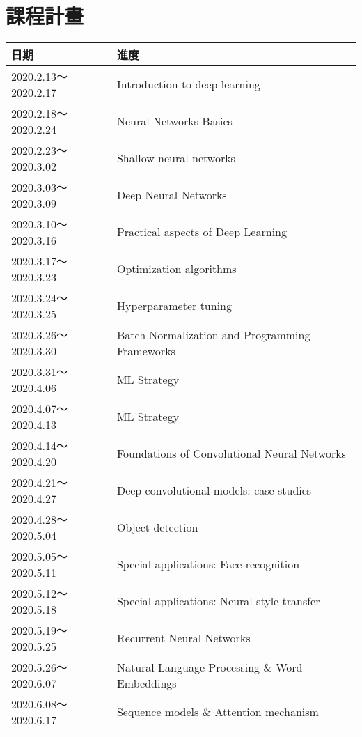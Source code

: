 \chapter*{課程計畫}
\begin{table}[H]
    \centering
    \begin{tabular}{|l|l|}
    \hline
        日期 & 進度 \\ \hline
        2020.2.13～2020.2.17 & Introduction to deep learning \\ \hline
        2020.2.18～2020.2.24 & Neural Networks Basics \\ \hline
        2020.2.23～2020.3.02 & Shallow neural networks \\ \hline
        2020.3.03～2020.3.09 & Deep Neural Networks \\ \hline
        2020.3.10～2020.3.16 & Practical aspects of Deep Learning \\ \hline
        2020.3.17～2020.3.23 & Optimization algorithms \\ \hline
        2020.3.24～2020.3.25 & Hyperparameter tuning \\ \hline
        2020.3.26～2020.3.30 & Batch Normalization and Programming Frameworks \\ \hline
        2020.3.31～2020.4.06 & ML Strategy \\ \hline
        2020.4.07～2020.4.13 & ML Strategy \\ \hline
        2020.4.14～2020.4.20 & Foundations of Convolutional Neural Networks \\ \hline
        2020.4.21～2020.4.27 & Deep convolutional models: case studies \\ \hline
        2020.4.28～2020.5.04 & Object detection \\ \hline
        2020.5.05～2020.5.11 & Special applications: Face recognition \\ \hline
        2020.5.12～2020.5.18 & Special applications: Neural style transfer \\ \hline
        2020.5.19～2020.5.25 & Recurrent Neural Networks \\ \hline
        2020.5.26～2020.6.07 & Natural Language Processing \& Word Embeddings \\ \hline
        2020.6.08～2020.6.17 & Sequence models \& Attention mechanism \\ \hline
    \end{tabular}
\end{table}
